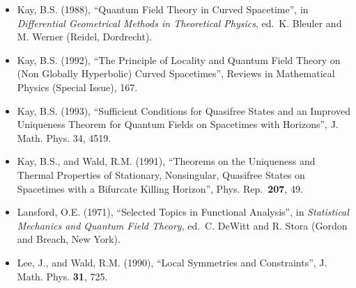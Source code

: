 \documentclass[11pt,a4paper]{article}
\begin{document}
\begin{itemize}
  Kay, B.S. (1985), ``The Double-Wedge Algebra for Quantum Fields on Schwarzschild and Minkowski Spacetimes'', Commun. Math. Phys. \textbf{100}, 57.
\item
  Kay, B.S. (1988), ``Quantum Field Theory in Curved Spacetime'', in \emph{Differential Geometrical Methods in Theoretical Physics}, ed.~K. Bleuler and M. Werner (Reidel, Dordrecht).
\item
  Kay, B.S. (1992), ``The Principle of Locality and Quantum Field Theory on (Non Globally Hyperbolic) Curved Spacetimes'', Reviews in Mathematical Physics (Special Issue), 167.
\item
  Kay, B.S. (1993), ``Sufficient Conditions for Quasifree States and an Improved Uniqueness Theorem for Quantum Fields on Spacetimes with Horizons'', J. Math. Phys. 34, 4519.
\item
  Kay, B.S., and Wald, R.M. (1991), ``Theorems on the Uniqueness and Thermal Properties of Stationary, Nonsingular, Quasifree States on Spacetimes with a Bifurcate Killing Horizon'', Phys. Rep.~\textbf{207}, 49.
\item
  Lansford, O.E. (1971), ``Selected Topics in Functional Analysis'', in \emph{Statistical Mechanics and Quantum Field Theory}, ed.~C. DeWitt and R. Stora (Gordon and Breach, New York).
\item
  Lee, J., and Wald, R.M. (1990), ``Local Symmetries and Constraints'', J. Math. Phys. \textbf{31}, 725.
\end{itemize}

\hypertarget{source-211}{}
\end{document}
